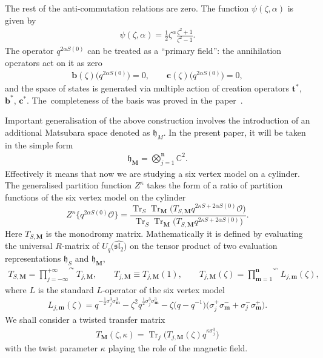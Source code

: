 \documentclass[pdftex]{sigma}
\numberwithin{equation}{section}
\DeclareMathOperator{\tr}{Tr}
\begin{document}
The rest of the anti-commutation relations are zero. The function $\psi(\zeta, \alpha)$ is given by
\begin{align*}
\psi(\zeta, \alpha)=\frac{1}{2}\zeta^{\alpha}\frac{\zeta^2+1}{\zeta^2-1}.
\end{align*}
The operator $q^{2\alpha S(0)}$ can be treated as a ``primary field'': the annihilation operators act on it as zero
\begin{align*}
\mathbf{b}(\zeta)\bigl(q^{2\alpha S(0)}\bigr)=0,
\qquad
\mathbf{c}(\zeta)\bigl(q^{2\alpha S(0)}\bigr)=0,
\end{align*}
and the space of states is generated via multiple action of creation operators $\mathbf{t}^{*}$, $\mathbf{b}^{*}$, $\mathbf{c}^{*}$. The~completeness of the basis was proved in the paper~\cite{BJMS_Completeness}.

Important generalisation of the above construction involves the introduction of an additional Matsubara space denoted as $\mathfrak{h}_{M}$. In the present paper, it will be taken in the simple form
\begin{align*}
\mathfrak{h}_\textbf{M}=\bigotimes\limits_{j=1}^{\mathbf{n}} \mathbb{C}^2.
\end{align*}
Effectively it means that now we are studying a six vertex model on a cylinder. The generalised partition function $Z^\kappa$ takes the form of a ratio of partition functions of the six vertex model on the cylinder
\begin{equation}\label{Reminder_GPF}
Z^\kappa\bigl\lbrace q^{2\alpha S(0)} \mathcal{O} \bigr\rbrace =\frac{\tr_S \tr_\textbf{M} \bigl(T_{S, \textbf{M}} q^{2\kappa S+2\alpha S(0)}\mathcal{O}\bigr)}{\tr_S \tr_\textbf{M} \bigl(T_{S, \textbf{M}} q^{2\kappa S+2\alpha S(0)}\bigr)}.
\end{equation}
Here $T_{S, \textbf{M}}$ is the monodromy matrix. Mathematically it is defined by evaluating the universal $R$-matrix of $U_q\bigl(\widehat{\mathfrak{sl}_2}\bigr)$ on the tensor product of two evaluation representations $\mathfrak{h}_S$ and $\mathfrak{h}_\textbf{M}$,
\begin{align*}
T_{S, \textbf{M}} = \overset{\curvearrowright}{\prod_{j=-\infty}^{+\infty}} T_{j, \textbf{M}},
\qquad
T_{j, \textbf{M}} \equiv T_{j, \textbf{M}}(1),
\qquad
T_{j, \textbf{M}}(\zeta)=\overset{\curvearrowleft}{\prod_{\mathbf{m}=1}^{\mathbf{n}}} L_{j, \textbf{m}}(\zeta),
\end{align*}
where $L$ is the standard $L$-operator of the six vertex model
\begin{align*}
L_{j, \textbf{m}}(\zeta)=q^{-\frac{1}{2}\sigma_{j}^{3}\sigma_{\textbf{m}}^3} - \zeta^{2}q^{\frac{1}{2}\sigma_{j}^3\sigma_\textbf{m}^{3}} - \zeta\bigl(q-q^{-1}\bigr)\bigl(\sigma_j^{+}\sigma_\textbf{m}^{-}+\sigma_{j}^{-}\sigma_{\textbf{m}}^{+}\bigr).
\end{align*}
We shall consider a twisted transfer matrix
\begin{align*}
T_{\textbf{M}}(\zeta, \kappa)=\tr_j \bigl(T_{j, \textbf{M}}(\zeta) q^{\kappa\sigma^3_j}\bigr)
\end{align*}
with the twist parameter $\kappa$ playing the role of the magnetic field.
\end{document}
